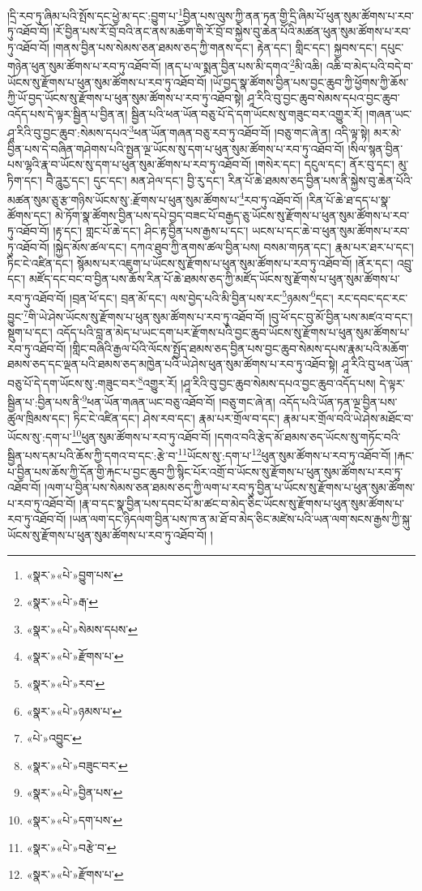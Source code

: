 །དྲི་རབ་ཏུ་ཞིམ་པའི་སྤོས་དང་ཕྱེ་མ་དང་:བྱུག་པ་\footnote{«སྣར་»«པེ་»བྱུག་པས་}བྱིན་པས་ལུས་ཀྱི་ནན་ཏན་གྱི་དྲི་ཞིམ་པོ་ཕུན་སུམ་ཚོགས་པ་རབ་ཏུ་འཐོབ་བོ། །རོ་བྱིན་པས་རོ་བྲོ་བའི་ནང་ནས་མཆོག་གི་རོ་བྲོ་བ་སྐྱེས་བུ་ཆེན་པོའི་མཚན་ཕུན་སུམ་ཚོགས་པ་རབ་ཏུ་འཐོབ་བོ། །གནས་བྱིན་པས་སེམས་ཅན་ཐམས་ཅད་ཀྱི་གནས་དང་། རྟེན་དང་། གླིང་དང་། སྐྱབས་དང་། དཔུང་གཉེན་ཕུན་སུམ་ཚོགས་པ་རབ་ཏུ་འཐོབ་བོ། །ནད་པ་ལ་སྨན་བྱིན་པས་མི་དགའ་\footnote{«སྣར་»«པེ་»རྒ་}མི་འཆི། འཆི་བ་མེད་པའི་བདེ་བ་ཡོངས་སུ་རྫོགས་པ་ཕུན་སུམ་ཚོགས་པ་རབ་ཏུ་འཐོབ་བོ། །ཡོ་བྱད་སྣ་ཚོགས་བྱིན་པས་བྱང་ཆུབ་ཀྱི་ཕྱོགས་ཀྱི་ཆོས་ཀྱི་ཡོ་བྱད་ཡོངས་སུ་རྫོགས་པ་ཕུན་སུམ་ཚོགས་པ་རབ་ཏུ་འཐོབ་སྟེ། ཤཱ་རིའི་བུ་བྱང་ཆུབ་སེམས་དཔའ་བྱང་ཆུབ་འདོད་པས་དེ་ལྟར་སྦྱིན་པ་བྱིན་ན། སྦྱིན་པའི་ཕན་ཡོན་བཅུ་པོ་དེ་དག་ཡོངས་སུ་གཟུང་བར་འགྱུར་རོ། །གཞན་ཡང་ཤཱ་རིའི་བུ་བྱང་ཆུབ་:སེམས་དཔའ་\footnote{«སྣར་»«པེ་»སེམས་དཔས་}ཕན་ཡོན་གཞན་བཅུ་རབ་ཏུ་འཐོབ་བོ། །བཅུ་གང་ཞེ་ན། འདི་ལྟ་སྟེ། མར་མེ་བྱིན་པས་དེ་བཞིན་གཤེགས་པའི་སྤྱན་ལྔ་ཡོངས་སུ་དག་པ་ཕུན་སུམ་ཚོགས་པ་རབ་ཏུ་འཐོབ་བོ། །སིལ་སྙན་བྱིན་པས་ལྷའི་རྣ་བ་ཡོངས་སུ་དག་པ་ཕུན་སུམ་ཚོགས་པ་རབ་ཏུ་འཐོབ་བོ། །གསེར་དང་། དངུལ་དང་། ནོར་བུ་དང་། མུ་ཏིག་དང་། བཻ་ཌཱུརྱ་དང་། དུང་དང་། མན་ཤེལ་དང་། བྱི་རུ་དང་། རིན་པོ་ཆེ་ཐམས་ཅད་བྱིན་པས་ནི་སྐྱེས་བུ་ཆེན་པོའི་མཚན་སུམ་ཅུ་རྩ་གཉིས་ཡོངས་སུ་:རྫོགས་པ་ཕུན་སུམ་ཚོགས་པ་\footnote{«སྣར་»«པེ་»རྫོགས་པ་}རབ་ཏུ་འཐོབ་བོ། །རིན་པོ་ཆེ་ཐ་དད་པ་སྣ་ཚོགས་དང་། མེ་ཏོག་སྣ་ཚོགས་བྱིན་པས་དཔེ་བྱད་བཟང་པོ་བརྒྱད་ཅུ་ཡོངས་སུ་རྫོགས་པ་ཕུན་སུམ་ཚོགས་པ་རབ་ཏུ་འཐོབ་བོ། །རྟ་དང་། གླང་པོ་ཆེ་དང་། ཤིང་རྟ་བྱིན་པས་རྒྱས་པ་དང་། ཡངས་པ་དང་ཆེ་བ་ཕུན་སུམ་ཚོགས་པ་རབ་ཏུ་འཐོབ་བོ། །སྐྱེད་མོས་ཚལ་དང་། དཀའ་ཐུབ་ཀྱི་ནགས་ཚལ་བྱིན་པས། བསམ་གཏན་དང་། རྣམ་པར་ཐར་པ་དང་། ཏིང་ངེ་འཛིན་དང་། སྙོམས་པར་འཇུག་པ་ཡོངས་སུ་རྫོགས་པ་ཕུན་སུམ་ཚོགས་པ་རབ་ཏུ་འཐོབ་བོ། །ནོར་དང་། འབྲུ་དང་། མཛོད་དང་བང་བ་བྱིན་པས་ཆོས་རིན་པོ་ཆེ་ཐམས་ཅད་ཀྱི་མཛོད་ཡོངས་སུ་རྫོགས་པ་ཕུན་སུམ་ཚོགས་པ་རབ་ཏུ་འཐོབ་བོ། །བྲན་ཕོ་དང་། བྲན་མོ་དང་། ལས་བྱེད་པའི་མི་བྱིན་པས་རང་\footnote{«སྣར་»«པེ་»རབ་}ཉམས་\footnote{«སྣར་»«པེ་»ཉམས་པ་}དང་། རང་དབང་དང་རང་བྱུང་\footnote{«པེ་»འབྱུང་}གི་ཡེ་ཤེས་ཡོངས་སུ་རྫོགས་པ་ཕུན་སུམ་ཚོགས་པ་རབ་ཏུ་འཐོབ་བོ། །བུ་ཕོ་དང་བུ་མོ་བྱིན་པས་མཛའ་བ་དང་། སྡུག་པ་དང་། འདོད་པའི་བླ་ན་མེད་པ་ཡང་དག་པར་རྫོགས་པའི་བྱང་ཆུབ་ཡོངས་སུ་རྫོགས་པ་ཕུན་སུམ་ཚོགས་པ་རབ་ཏུ་འཐོབ་བོ། །གླིང་བཞིའི་རྒྱལ་པོའི་ལོངས་སྤྱོད་ཐམས་ཅད་བྱིན་པས་བྱང་ཆུབ་སེམས་དཔས་རྣམ་པའི་མཆོག་ཐམས་ཅད་དང་ལྡན་པའི་ཐམས་ཅད་མཁྱེན་པའི་ཡེ་ཤེས་ཕུན་སུམ་ཚོགས་པ་རབ་ཏུ་འཐོབ་སྟེ། ཤཱ་རིའི་བུ་ཕན་ཡོན་བཅུ་པོ་དེ་དག་ཡོངས་སུ་:གཟུང་བར་\footnote{«སྣར་»«པེ་»བཟུང་བར་}འགྱུར་རོ། །ཤཱ་རིའི་བུ་བྱང་ཆུབ་སེམས་དཔའ་བྱང་ཆུབ་འདོད་པས། དེ་ལྟར་སྦྱིན་པ་:བྱིན་པས་ནི་\footnote{«སྣར་»«པེ་»བྱིན་པས་}ཕན་ཡོན་གཞན་ཡང་བཅུ་འཐོབ་བོ། །བཅུ་གང་ཞེ་ན། འདོད་པའི་ཡོན་ཏན་ལྔ་བྱིན་པས་ཚུལ་ཁྲིམས་དང་། ཏིང་ངེ་འཛིན་དང་། ཤེས་རབ་དང་། རྣམ་པར་གྲོལ་བ་དང་། རྣམ་པར་གྲོལ་བའི་ཡེ་ཤེས་མཐོང་བ་ཡོངས་སུ་:དག་པ་\footnote{«སྣར་»«པེ་»དག་པས་}ཕུན་སུམ་ཚོགས་པ་རབ་ཏུ་འཐོབ་བོ། །དགའ་བའི་རྩེད་མོ་ཐམས་ཅད་ཡོངས་སུ་གཏོང་བའི་སྦྱིན་པས་དམ་པའི་ཆོས་ཀྱི་དགའ་བ་དང་:རྩེ་བ་\footnote{«སྣར་»«པེ་»བརྩེ་བ་}ཡོངས་སུ་:དག་པ་\footnote{«སྣར་»«པེ་»རྫོགས་པ་}ཕུན་སུམ་ཚོགས་པ་རབ་ཏུ་འཐོབ་བོ། །རྐང་པ་བྱིན་པས་ཆོས་ཀྱི་དོན་གྱི་རྐང་པ་བྱང་ཆུབ་ཀྱི་སྙིང་པོར་འགྲོ་བ་ཡོངས་སུ་རྫོགས་པ་ཕུན་སུམ་ཚོགས་པ་རབ་ཏུ་འཐོབ་བོ། །ལག་པ་བྱིན་པས་སེམས་ཅན་ཐམས་ཅད་ཀྱི་ལག་པ་རབ་ཏུ་བྱིན་པ་ཡོངས་སུ་རྫོགས་པ་ཕུན་སུམ་ཚོགས་པ་རབ་ཏུ་འཐོབ་བོ། །རྣ་བ་དང་སྣ་བྱིན་པས་དབང་པོ་མ་ཚང་བ་མེད་ཅིང་ཡོངས་སུ་རྫོགས་པ་ཕུན་སུམ་ཚོགས་པ་རབ་ཏུ་འཐོབ་བོ། །ཡན་ལག་དང་ཉིདལག་བྱིན་པས་ཁ་ན་མ་ཐོ་བ་མེད་ཅིང་མཛེས་པའི་ཡན་ལག་སངས་རྒྱས་ཀྱི་སྐུ་ཡོངས་སུ་རྫོགས་པ་ཕུན་སུམ་ཚོགས་པ་རབ་ཏུ་འཐོབ་བོ། །
